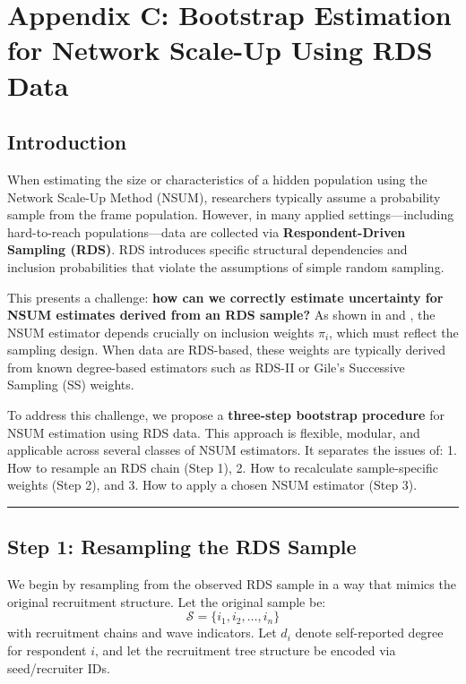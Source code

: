 \documentclass[
  12pt,
  letterpaper,
  DIV=11,
  numbers=noendperiod]{scrartcl}
\theoremstyle{plain}
\theoremstyle{definition}
\begin{document}
\section{Appendix C: Bootstrap Estimation for Network Scale-Up Using RDS
Data}\label{appendix-c-bootstrap-estimation-for-network-scale-up-using-rds-data}

\subsection{Introduction}\label{introduction-1}

When estimating the size or characteristics of a hidden population using
the Network Scale-Up Method (NSUM), researchers typically assume a
probability sample from the frame population. However, in many applied
settings---including hard-to-reach populations---data are collected via
\textbf{Respondent-Driven Sampling (RDS)}. RDS introduces specific
structural dependencies and inclusion probabilities that violate the
assumptions of simple random sampling.

This presents a challenge: \textbf{how can we correctly estimate
uncertainty for NSUM estimates derived from an RDS sample?} As shown in
\textcite{feeh16-generali} and \textcite{salg06-variance}, the NSUM
estimator depends crucially on inclusion weights \(\pi_i\), which must
reflect the sampling design. When data are RDS-based, these weights are
typically derived from known degree-based estimators such as RDS-II or
Gile's Successive Sampling (SS) weights.

To address this challenge, we propose a \textbf{three-step bootstrap
procedure} for NSUM estimation using RDS data. This approach is
flexible, modular, and applicable across several classes of NSUM
estimators. It separates the issues of: 1. How to resample an RDS chain
(Step 1), 2. How to recalculate sample-specific weights (Step 2), and 3.
How to apply a chosen NSUM estimator (Step 3).

\begin{center}\rule{0.5\linewidth}{0.5pt}\end{center}

\subsection{Step 1: Resampling the RDS
Sample}\label{step-1-resampling-the-rds-sample}

We begin by resampling from the observed RDS sample in a way that mimics
the original recruitment structure. Let the original sample be: \[
\mathcal{S} = \{i_1, i_2, \dots, i_n\}
\] with recruitment chains and wave indicators. Let \(d_i\) denote
self-reported degree for respondent \(i\), and let the recruitment tree
structure be encoded via seed/recruiter IDs.
\end{document}
